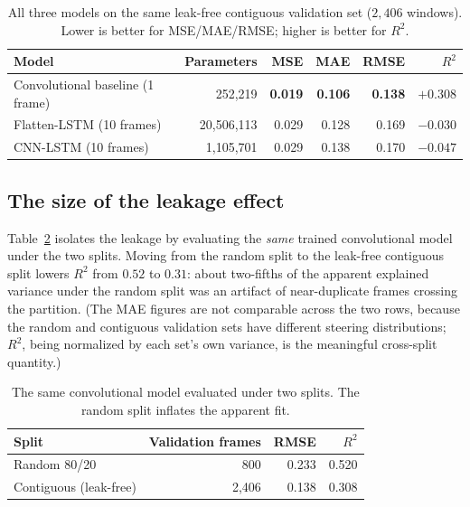 \documentclass[11pt]{article}
\begin{document}
\begin{table}[h]
\centering
\caption{All three models on the same leak-free contiguous validation set
($2{,}406$ windows). Lower is better for MSE/MAE/RMSE; higher is better for $R^2$.}
\label{tab:main}
\begin{tabular}{lrrrrr}
\toprule
Model & Parameters & MSE & MAE & RMSE & $R^2$ \\
\midrule
Convolutional baseline (1 frame)  & 252{,}219      & \textbf{0.019} & \textbf{0.106} & \textbf{0.138} & $\mathbf{+0.308}$ \\
Flatten-LSTM (10 frames)          & 20{,}506{,}113 & 0.029          & 0.128          & 0.169          & $-0.030$ \\
CNN-LSTM (10 frames)              & 1{,}105{,}701  & 0.029          & 0.138          & 0.170          & $-0.047$ \\
\bottomrule
\end{tabular}
\end{table}

\subsection{The size of the leakage effect}

Table~\ref{tab:leak} isolates the leakage by evaluating the \emph{same} trained
convolutional model under the two splits. Moving from the random split to the
leak-free contiguous split lowers $R^2$ from $0.52$ to $0.31$: about two-fifths of
the apparent explained variance under the random split was an artifact of
near-duplicate frames crossing the partition. (The MAE figures are not comparable
across the two rows, because the random and contiguous validation sets have
different steering distributions; $R^2$, being normalized by each set's own
variance, is the meaningful cross-split quantity.)

\begin{table}[h]
\centering
\caption{The same convolutional model evaluated under two splits. The random split
inflates the apparent fit.}
\label{tab:leak}
\begin{tabular}{lrrr}
\toprule
Split & Validation frames & RMSE & $R^2$ \\
\midrule
Random 80/20            & 800   & 0.233 & 0.520 \\
Contiguous (leak-free)  & 2{,}406 & 0.138 & 0.308 \\
\bottomrule
\end{tabular}
\end{table}
\end{document}
